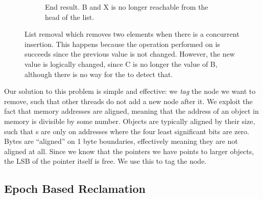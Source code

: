 \documentclass[b5paper]{report}
\begin{document}
\begin{figure}[ht]
  \begin{subfigure}[b]{\textwidth}
      \centering
      \caption{End result. B and X is no longer reachable from the head of the
        list. \label{fig:list-remove-b}}
  \end{subfigure}
  \caption{List removal which removes two elements when there is a concurrent
  insertion. This happens because the  operation
  performed on  is succeeds since the previous value is not
  changed.  However, the new value is logically changed, since C is no longer
  the  value of B, although there is no way for the  to
  detect that.\label{fig:list-remove}} \end{figure}

Our solution to this problem is simple and effective: we \emph{tag} the node we
want to remove, such that other threads do not add a new node after it. We
exploit the fact that memory addresses are aligned, meaning that the address of
an object in memory is divisible by some number. Objects are typically aligned
by their size, such that s are only on addresses where the four least
significant bits are zero. Bytes are ``aligned'' on 1 byte boundaries,
effectively meaning they are not aligned at all. Since we know that the pointers
we have points to larger objects, the LSB of the pointer itself is free. We use
this to tag the node.


\subsection{Epoch Based Reclamation}
\end{document}
